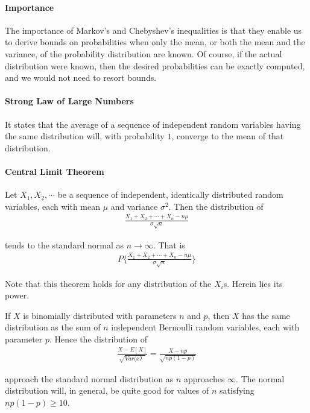 \documentclass[10 pt,final]{article}
\newcommand{\impo}[1]{{\color{magenta} #1}}
\begin{document}
\paragraph{Importance} The importance of Markov's and Chebyshev's inequalities is that they enable us to \impo{derive bounds} on probabilities when only the mean, or both the mean and the variance, of the probability distribution are known. Of course, if the actual distribution were known, then the desired probabilities can be exactly computed, and we would not need to resort bounds.


\paragraph{Strong Law of Large Numbers} It states that the \impo{average} of a sequence of independent random variables having the same distribution will, with probability $1$, \impo{converge to the mean} of that distribution.


\paragraph{Central Limit Theorem} Let $X_1, X_2, \cdots$ be a sequence of independent, identically distributed random variables, each with mean $\mu$ and variance $\sigma^2$. Then the distribution of 
\begin{align*}
\frac{X_1 + X_2 + \cdots + X_n - n\mu}{\sigma \sqrt{n}}
\end{align*}

tends to the standard normal as $n \to \infty$. That is
\begin{align*}
P\{\frac{X_1 + X_2 + \cdots + X_n - n\mu}{\sigma \sqrt{n}}\} 
\end{align*}

Note that this theorem holds for \impo{any distribution} of the $X_i$s. Herein lies its power.

If $X$ is binomially distributed with parameters $n$ and $p$, then $X$ has the same distribution as the sum of $n$ independent Bernoulli random variables, each with parameter $p$. Hence the distribution of 
\begin{align*}
\frac{X-E[X]}{\sqrt{Var(x）}} =  \frac{X-np}{\sqrt{np(1-p)}}
\end{align*}

approach the standard normal distribution as $n$ approaches $\infty$. The normal distribution will, in general, be quite good for values of $n$ satisfying $np(1-p) \geq 10$.
\end{document}
